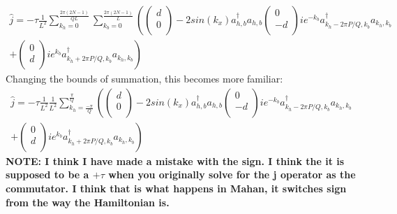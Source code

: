 \documentclass[12pt]{article}
\begin{document}
\begin{multline}
\hat{j} = -\tau 
\frac{1}{L^2} \sum_{k_h =0}^{\frac{2 \pi (2N-1)}{QL}} \sum_{k_b =0}^{\frac{2 \pi (2N-1)}{L}} \left( \begin{pmatrix}
			d \\
		0\\
		\end{pmatrix} -2 sin(k_x) a^\dagger_{h,b}  a_{h,b}\begin{pmatrix}
			0 \\
		-d\\
		\end{pmatrix} ie^{-k_b} a^\dagger_{k_h-2 \pi P/Q,k_b}  a_{k_h,k_b}\right. \\
		\left.+ \begin{pmatrix}
			0 \\
		d\\
		\end{pmatrix} ie^{k_b} a^\dagger_{k_h+2\pi P/Q,k_b}  a_{k_h,k_b} \right) 
\end{multline}
Changing the bounds of summation, this becomes more familiar:
\begin{multline}
\hat{j} = -\tau 
\frac{1}{L^2} \frac{1}{L^2} \sum_{k_h =\frac{- \pi}{Q}}^{\frac{\pi}{Q}} \left( \begin{pmatrix}
			d \\
		0\\
		\end{pmatrix}- 2 sin(k_x) a^\dagger_{h,b}  a_{h,b}\begin{pmatrix}
			0 \\
		-d\\
		\end{pmatrix} ie^{-k_b} a^\dagger_{k_h-2 \pi P/Q,k_b}  a_{k_h,k_b}\right.\\
		\left.+ \begin{pmatrix}
			0 \\
		d\\
		\end{pmatrix} ie^{k_b} a^\dagger_{k_h+2\pi P/Q,k_b}  a_{k_h,k_b} \right) 
\end{multline}
\textbf{NOTE: I think I have made a mistake with the sign. I think
the it is supposed to be a $+\tau$ when you originally solve for the
j operator as the commutator. I think that is what happens in Mahan, it switches sign from the way the Hamiltonian is. }
\end{document}
